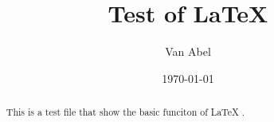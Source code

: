 \documentclass{amsart}
\begin{document}
\title{Test of \LaTeX}
\author{Van Abel}
\date{\today}
\maketitle
\begin{abstract}
	This is a test file that show the basic funciton of \LaTeX
.\end{abstract}
\end{document}
